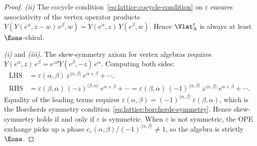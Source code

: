 \begin{proof}
\emph{(ii)} The cocycle condition~\eqref{eq:lattice:cocycle-condition}
on $\varepsilon$ ensures associativity of the vertex operator products
$Y(Y(e^\alpha,z-w)\,e^\beta, w) = Y(e^\alpha, z)\,Y(e^\beta, w)$.
Hence $\Vlat_\Lambda^\varepsilon$ is always at least $\Eone$-chiral.

\emph{(i)} and \emph{(iii).} The skew-symmetry axiom for vertex
algebras requires
$Y(e^\alpha, z)\, e^\beta = e^{z\partial} Y(e^\beta, -z)\, e^\alpha$.
Computing both sides:
\begin{align*}
\text{LHS}
&= \varepsilon(\alpha,\beta)\, z^{\langle\alpha,\beta\rangle}\,
 e^{\alpha+\beta} + \cdots, \\
\text{RHS}
&= \varepsilon(\beta,\alpha)\, (-z)^{\langle\beta,\alpha\rangle}\,
 e^{\alpha+\beta} + \cdots
= \varepsilon(\beta,\alpha)\,(-1)^{\langle\alpha,\beta\rangle}\,
 z^{\langle\alpha,\beta\rangle}\, e^{\alpha+\beta} + \cdots.
\end{align*}
Equality of the leading terms requires
$\varepsilon(\alpha,\beta) =
(-1)^{\langle\alpha,\beta\rangle}\,\varepsilon(\beta,\alpha)$,
which is the Borcherds symmetry condition~\eqref{eq:lattice:borcherds-symmetry}.
Hence skew-symmetry holds if and only if $\varepsilon$ is symmetric.
When $\varepsilon$ is not symmetric, the OPE exchange picks up a phase
$c_\varepsilon(\alpha,\beta)/(-1)^{\langle\alpha,\beta\rangle} \neq 1$,
so the algebra is strictly $\Eone$.
\end{proof}

